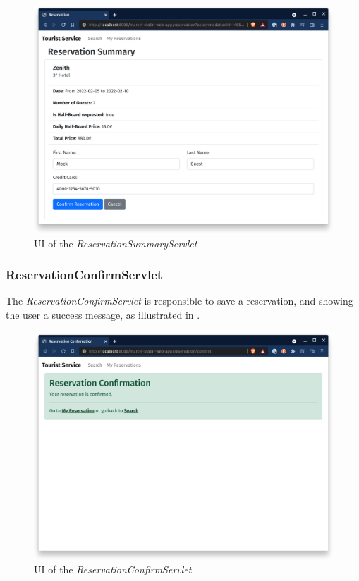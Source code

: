 \begin{figure}[h]
\centering
\includegraphics[scale=0.14]{images/02_design/web-app-reservation-summary}
\caption{UI of the \textit{ReservationSummaryServlet}}
\label{fig:02_design_web_reservationsummary_page}
\end{figure}

\newpage
\subsubsection{ReservationConfirmServlet}\label{sec:02_design_web_reservationconfirm}
The \textit{ReservationConfirmServlet} is responsible to save a reservation, and showing the user a success message, as illustrated in .

\begin{figure}[h]
\centering
\includegraphics[scale=0.14]{images/02_design/web-app-reservation-confirm}
\caption{UI of the \textit{ReservationConfirmServlet}}
\label{fig:02_design_web_reservationconfirm_page}
\end{figure}

